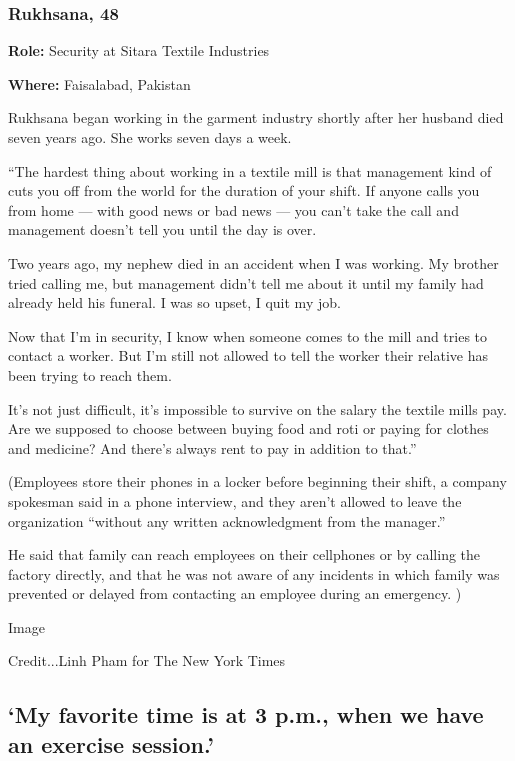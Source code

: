 \hypertarget{rukhsana-48}{%
\subsubsection{Rukhsana, 48}\label{rukhsana-48}}

\textbf{Role:} Security at Sitara Textile Industries

\textbf{Where:} Faisalabad, Pakistan

Rukhsana began working in the garment industry shortly after her husband
died seven years ago. She works seven days a week.

``The hardest thing about working in a textile mill is that management
kind of cuts you off from the world for the duration of your shift. If
anyone calls you from home --- with good news or bad news --- you can't
take the call and management doesn't tell you until the day is over.

Two years ago, my nephew died in an accident when I was working. My
brother tried calling me, but management didn't tell me about it until
my family had already held his funeral. I was so upset, I quit my job.

Now that I'm in security, I know when someone comes to the mill and
tries to contact a worker. But I'm still not allowed to tell the worker
their relative has been trying to reach them.

It's not just difficult, it's impossible to survive on the salary the
textile mills pay. Are we supposed to choose between buying food and
roti or paying for clothes and medicine? And there's always rent to pay
in addition to that.''

(Employees store their phones in a locker before beginning their shift,
a company spokesman said in a phone interview, and they aren't allowed
to leave the organization ``without any written acknowledgment from the
manager.''

He said that family can reach employees on their cellphones or by
calling the factory directly, and that he was not aware of any incidents
in which family was prevented or delayed from contacting an employee
during an emergency. )

Image

Credit...Linh Pham for The New York Times

\hypertarget{my-favorite-time-is-at-3-pm-when-we-have-an-exercise-session}{%
\subsection{`My favorite time is at 3 p.m., when we have an exercise
session.'}\label{my-favorite-time-is-at-3-pm-when-we-have-an-exercise-session}}

